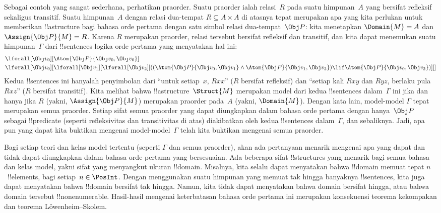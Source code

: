 \documentclass[../../../include/open-logic-section]{subfiles}
\begin{document}
Sebagai contoh yang sangat sederhana, perhatikan praorder. Suatu praorder
ialah relasi~$R$ pada suatu himpunan~$A$ yang bersifat refleksif sekaligus
transitif. Suatu himpunan~$A$ dengan relasi dua-tempat $R \subseteq A \times
A$ di atasnya tepat merupakan apa yang kita perlukan untuk memberikan
!!a{structure} bagi bahasa orde pertama dengan satu simbol relasi dua-tempat~$\Obj P$:
kita menetapkan $\Domain{M} = A$ dan $\Assign{\Obj P}{M} = R$.
Karena $R$ merupakan praorder, relasi tersebut bersifat refleksif dan
transitif, dan kita dapat menemukan suatu himpunan~$\Gamma$ dari
!!{sentence}s logika orde pertama yang menyatakan hal ini:
\begin{align*}
  & \lforall[\Obj v_0][\Atom{\Obj P}{\Obj v_0,\Obj v_0}]\\
  & \lforall[\Obj v_0][\lforall[\Obj v_1][\lforall[\Obj v_2][((\Atom{\Obj P}{\Obj v_0,\Obj v_1} \land \Atom{\Obj P}{\Obj v_1,\Obj v_2}) \lif \Atom{\Obj P}{\Obj v_0,\Obj v_2})]]]
\end{align*}
Kedua !!{sentence}s ini hanyalah penyimbolan dari ``untuk setiap~$x$, $Rxx$''
($R$ bersifat refleksif) dan ``setiap kali $Rxy$ dan $Ryz$, berlaku pula
$Rxz$'' ($R$ bersifat transitif). Kita melihat bahwa
!!a{structure}~$\Struct{M}$ merupakan model dari kedua !!{sentence}s dalam~$\Gamma$
ini jika dan hanya jika $R$ (yakni, $\Assign{\Obj P}{M}$)
merupakan praorder pada~$A$ (yakni, $\Domain{M}$). Dengan kata lain,
model-model $\Gamma$ tepat merupakan semua praorder. Setiap sifat semua
praorder yang dapat diungkapkan dalam bahasa orde pertama dengan hanya~$\Obj P$
sebagai !!{predicate} (seperti refleksivitas dan transitivitas di
atas) diakibatkan oleh kedua !!{sentence}s dalam~$\Gamma$, dan sebaliknya.
Jadi, apa pun yang dapat kita buktikan mengenai model-model~$\Gamma$ telah
kita buktikan mengenai semua praorder.

Bagi setiap teori dan kelas model tertentu (seperti $\Gamma$ dan semua
praorder), akan ada pertanyaan menarik mengenai apa yang dapat dan tidak dapat
diungkapkan dalam bahasa orde pertama yang bersesuaian. Ada beberapa sifat
!!{structure}s yang menarik bagi semua bahasa dan kelas model, yakni sifat
yang menyangkut ukuran !!{domain}. Misalnya, kita selalu dapat menyatakan
bahwa !!{domain} memuat tepat $n$~!!{element}s, bagi setiap~$n \in \PosInt$.
Dengan menggunakan suatu himpunan yang memuat tak hingga banyaknya
!!{sentence}s, kita juga dapat menyatakan bahwa !!{domain} bersifat tak
hingga. Namun, kita tidak dapat menyatakan bahwa domain bersifat hingga, atau
bahwa domain tersebut !!{nonenumerable}. Hasil-hasil mengenai keterbatasan
bahasa orde pertama ini merupakan konsekuensi teorema kekompakan dan teorema
L\"owenheim--Skolem.
\end{document}
